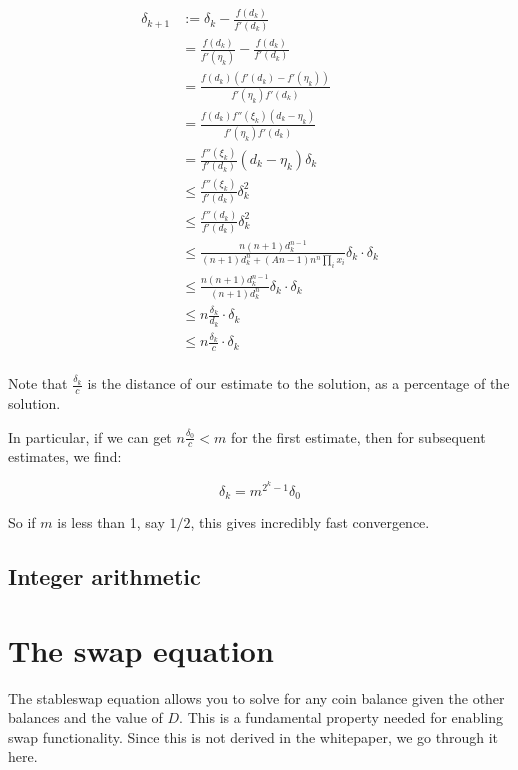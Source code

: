 \documentclass[
]{article}
\begin{document}
\[\begin{aligned}
\delta_{k+1} &:= \delta_k - \frac{f(d_k)}{f'(d_k)} \\
&= \frac{f(d_k)}{f'(\eta_k)} - \frac{f(d_k)}{f'(d_k)} \\
&= \frac{ f(d_k) (f'(d_k) - f'(\eta_k)) }{f'(\eta_k) f'(d_k)} \\
&= \frac{ f(d_k) f''(\xi_k)(d_k - \eta_k)}{f'(\eta_k) f'(d_k)} \\
&= \frac{f''(\xi_k)}{f'(d_k)} (d_k - \eta_k) \delta_k\\
&\leq \frac{f''(\xi_k)}{f'(d_k)} \delta_k^2\\
&\leq \frac{f''(d_k)}{f'(d_k)} \delta_k^2\\
&\leq \frac{n (n+1) d_k^{n-1} }{(n+1) d_k^n + (An - 1) n^n \prod_i x_i  }\delta_k  \cdot \delta_k\\
&\leq \frac{n (n+1) d_k^{n-1} }{(n+1) d_k^n }\delta_k  \cdot \delta_k\\
&\leq n\frac{\delta_k}{d_k } \cdot \delta_k\\
&\leq n\frac{\delta_k}{c } \cdot \delta_k\\
\end{aligned}\]

Note that \(\frac{\delta_k}{c}\) is the distance of our estimate to the
solution, as a percentage of the solution.

In particular, if we can get \(n\frac{\delta_0}{c} < m\) for the first
estimate, then for subsequent estimates, we find:

\[ \delta_{k} = m^{2^k - 1} \delta_0\]

So if \(m\) is less than 1, say \(1/2\), this gives incredibly fast
convergence.

\hypertarget{integer-arithmetic}{%
\subsection{Integer arithmetic}\label{integer-arithmetic}}

\hypertarget{the-swap-equation}{%
\section{The swap equation}\label{the-swap-equation}}

The stableswap equation allows you to solve for any coin balance given
the other balances and the value of \(D\). This is a fundamental
property needed for enabling swap functionality. Since this is not
derived in the whitepaper, we go through it here.
\end{document}

